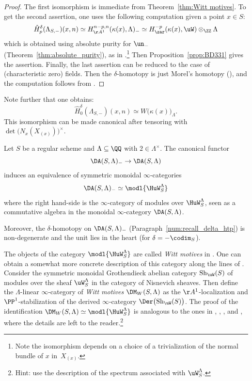 \begin{proof}
The first isomorphism is immediate from Theorem~\ref{thm:Witt motives}. To get the second assertion, one uses the following computation
given a point $x \in S$:
\[
\hat H_p^\delta(\Lambda_{S,-})(x,n) \simeq H^{n-p,n}_{\AA^1}(\kappa(x),\Lambda)_-
\simeq H^{-p}_\zar(\kappa(x),\uW) \otimes_\ZZ \Lambda
\]
which is obtained using absolute purity for $\un_-$ (Theorem~\ref{thm:absolute_purity}),
as in \cite[Ex.\,3.2.8]{BD1}.\footnote{Note the isomorphism depends on a choice
of a trivialization of the normal bundle of $x$ in~$X_{(x)}$.}
Then Proposition~\ref{prop:BD331} gives the assertion.
Finally, the last assertion can be reduced to the case of (characteristic zero)
fields. Then the $\delta$-homotopy \tstructure is just Morel's homotopy \tstructure
(\cite[Ex.\,2.3.5(2)]{BD1}), and the computation follows from \cite[Th.\,1, Rem.\,1]{ALP}.
\end{proof}

\begin{rem}
Note further that one obtains:
\[\hat H_0^\delta(\Lambda_{S,-})(x,n) \simeq W\big(\kappa(x)\big)_\Lambda.\]
This isomorphism
can be made canonical after tensoring with $\det\big(N_x(X_{(x)})\big)^\times$.
\end{rem}

\begin{cor}\label{cor:minus_DA&Witt_modl}
Let $S$ be a regular scheme and $\Lambda \subseteq \QQ$ with $2 \in \Lambda^\times$.
The canonical functor
\[
\DA(S,\Lambda)_- \to \DA(S,\Lambda)
\]
induces an equivalence of symmetric monoidal $\infty$-categories
\[
\DA(S,\Lambda)_- \simeq \modl{\HuW_S^\Lambda}
\]
where the right hand-side is the $\infty$-category of modules
over $\HuW_S^\Lambda$, seen as a commutative algebra in the
monoidal $\infty$-category $\DA(S,\Lambda)$.

Moreover, the $\delta$-homotopy \tstructure
on $\DA(S,\Lambda)_-$
(Paragraph~\ref{num:recall_delta_htp})
is non-degenerate and the unit lies in the heart
(for $\delta=-\codim_S$).
\end{cor}

\begin{rem}
The objects of the category $\modl{\HuW_S^\Lambda}$ are called \emph{Witt motives}
in \cite[\S 4]{ALP}. One can obtain a somewhat more concrete description
of this category along the lines of \cite{ALP}.
Consider the symmetric monoidal Grothendieck abelian category
$\mathrm{Sh}_{\uW}(S)$ of modules over the sheaf $\uW_S^\Lambda$ in the category of Nisnevich sheaves.
Then define the $\Lambda$-linear $\infty$-category of \emph{Witt motives}
$\DM_W(S,\Lambda)$ as the $\AA^1$\nobreakdash-localization and $\PP^1$-stabilization of the derived $\infty$-category $\Der\big(\mathrm{Sh}_{\uW}(S)\big)$.
The proof of the identification $\DM_W(S,\Lambda) \simeq \modl{\HuW_S^\Lambda}$ is analogous to the ones in \cite{RO}, \cite{CD5}, \cite{BachmannFasel}, \cite{EHKSY3} and \cite{ElmantoKolderup}, where the details are left to the reader.\footnote{Hint: use the description of the spectrum associated with $\uW_S^\Lambda$.}
\end{rem}

